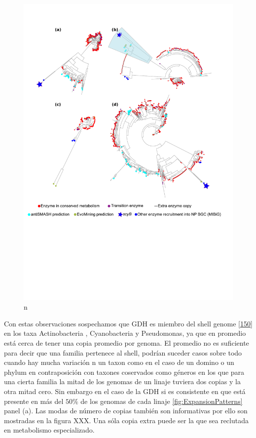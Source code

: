 \documentclass[12pt,twoside]{reedthesis}
\begin{document}
  \begin{figure}[h!tbp]
  \centering
  \includegraphics[angle = 0,scale = .8]{chapter2/FigurasPaper/Figure4.pdf}
  \caption[EvoMining en cuatro linajes genómicos]{\footnotesize{n}}
  \label{fig:GenomicLinajes}
  \end{figure}
  
  Con estas observaciones sospechamos que GDH es miembro del shell genome
  {[}\protect\hyperlink{ref-koonin_genomics_2008}{150}{]} en los taxa
  Actinobacteria , Cyanobacteria y Pseudomonas, ya que en promedio está
  cerca de tener una copia promedio por genoma. El promedio no es
  suficiente para decir que una familia pertenece al shell, podrían
  suceder casos sobre todo cuando hay mucha variación n un taxon como en
  el caso de un domino o un phylum en contraposición con taxones
  coservados como géneros en los que para una cierta familia la mitad de
  los genomas de un linaje tuviera dos copias y la otra mitad cero. Sin
  embargo en el caso de la GDH si es consistente en que está presente en
  más del \(50\%\) de los genomas de cada linaje
  \autoref{fig:ExpansionPatterns} panel (a). Las modas de número de copias
  también son informativas por ello son mostradas en la figura XXX. Una
  sóla copia extra puede ser la que sea reclutada en metabolismo
  especializado.
  
\end{document}
